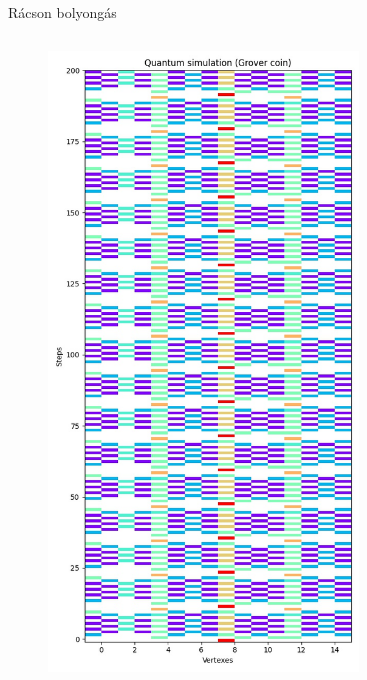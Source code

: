 \documentclass[aspectratio=169]{beamer}
\begin{document}
\begin{frame}{Rácson bolyongás}
\begin{columns}[onlytextwidth]
\begin{column}{.23\textwidth}
      \begin{figure}
        \includegraphics[width=0.9\textwidth]{./tdk_figures/results/grid/grover.jpg}
      \end{figure}
    \end{column}
    \begin{column}{.23\textwidth}
      \begin{figure}

\end{figure}
\end{column}
\end{columns}
\end{frame}
\end{document}
